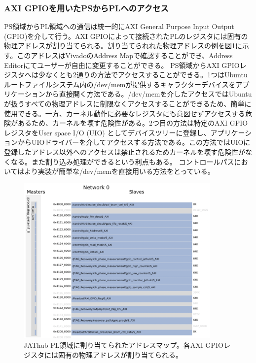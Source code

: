 \subsubsection{AXI GPIOを用いたPSからPLへのアクセス}
\label{subsubsec_axi}
\baselineskip
PS領域からPL領域への通信は統一的にAXI General Purpose Input Output (GPIO)を介して行う。AXI GPIOによって接続されたPLのレジスタには固有の物理アドレスが割り当てられる。割り当てられれた物理アドレスの例を図\ref{JATHuaddress}に示す。このアドレスはVivadoのAddress Mapで確認することができ、Address Editorにてユーザーが自由に変更することができる。
PS領域からAXI GPIOレジスタへは少なくとも2通りの方法でアクセスすることができる。1つはUbuntuルートファイルシステム内の/dev/memが提供するキャラクターデバイスをアプリケーションから直接開く方法である。/dev/memを介したアクセスではUbuntuが扱うすべての物理アドレスに制限なくアクセスすることができるため、簡単に使用できる。一方、カーネル動作に必要なレジスタにも意図せずアクセスする危険があるため、カーネルを壊す危険性がある。2つ目の方法は特定のAXI GPIOレジスタをUser space I/O (UIO) としてデバイスツリーに登録し、アプリケーションからUIOドライバーを介してアクセスする方法である。この方法ではUIOに登録したアドレス以外へのアクセスは禁止されるためカーネルを壊す危険性がなくなる。また割り込み処理ができるという利点もある。
コントロールパスにおいてはより実装が簡単な/dev/memを直接用いる方法をとっている。
\baselineskip

\begin{figure} 
\centering
\includegraphics[width=10cm]{fig/QAQC/JATHubaddress.png}
\caption[アドレスマップ]{JAThub PL領域に割り当てられたアドレスマップ。各AXI GPIOレジスタには固有の物理アドレスが割り当てられる。}
\label{JATHuaddress}
\end{figure}

